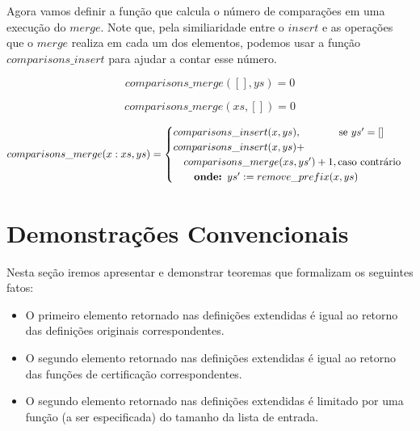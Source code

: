 \documentclass[12pt, oneside, a4paper,english,brazil]{abntex2}
\begin{document}
\qquad Agora vamos definir a fun\c{c}\~ao que calcula o n\'umero de compara\c{c}\~oes em uma execu\c{c}\~ao
do $merge$. Note que, pela similiaridade entre
o $insert$ e as opera\c{c}\~oes que o $merge$ realiza em cada um dos elementos,
podemos usar a fun\c{c}\~ao $comparisons\_insert$ para ajudar a contar esse n\'umero.

\begin{equation}
  comparisons\_merge([], ys) = 0
\end{equation}

\begin{equation}
  comparisons\_merge(xs, []) = 0
\end{equation}

\begin{equation}
\begin{split}
  comparisons\_merge(x : xs, ys) =
      \begin{cases}
        comparisons\_insert(x, ys), \text{\qquad \quad \,\, se } ys' = [] \\
        comparisons\_insert(x, ys) + \\ \text{\quad} comparisons\_merge(xs, ys') + 1, \text{caso contr\'ario}\\
        \text{\qquad\textbf{onde: }} ys' := remove\_prefix(x, ys)
      \end{cases} \\
\end{split}
\end{equation}

\chapter{Demonstra\c{c}\~oes Convencionais}

Nesta se\c{c}\~ao iremos apresentar e demonstrar teoremas que formalizam os seguintes fatos:
\begin{itemize}
  \item O primeiro elemento retornado nas defini\c{c}\~oes extendidas \'e igual ao retorno das defini\c{c}\~oes originais correspondentes.
  \item O segundo elemento retornado nas defini\c{c}\~oes extendidas \'e igual ao retorno das fun\c{c}\~oes de certifica\c{c}\~ao correspondentes.
  \item O segundo elemento retornado nas defini\c{c}\~oes extendidas \'e limitado por uma fun\c{c}\~ao (a ser especificada) do tamanho da lista de entrada.
\end{itemize}
\end{document}

